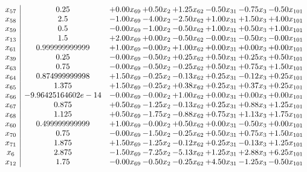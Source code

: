 \documentclass[8pt]{article}
\begin{document}
\[\begin{array}{c| c c@{\hskip 2pt} c@{\hskip 2pt} c@{\hskip 2pt} c@{\hskip 2pt} c@{\hskip 2pt} c@{\hskip 2pt} }
 x_{57}   &  0.25 & +  0.00 x_{69} & +  0.50 x_{2} & +  1.25 x_{62} & -0.50 x_{31} & -0.75 x_{3} & -0.50 x_{101}\\
 x_{58}   &  2.5 & -1.00 x_{69} & -4.00 x_{2} & -2.50 x_{62} & +  1.00 x_{31} & +  1.50 x_{3} & +  4.00 x_{101}\\
 x_{59}   &  0.5 & -0.00 x_{69} & -1.00 x_{2} & -0.50 x_{62} & +  1.00 x_{31} & +  0.50 x_{3} & +  1.00 x_{101}\\
 x_{13}   &  1.5 & +  2.00 x_{69} & +  0.00 x_{2} & -0.50 x_{62} & -0.00 x_{31} & -0.50 x_{3} & -0.00 x_{101}\\
 x_{61}   &  0.999999999999 & +  1.00 x_{69} & -0.00 x_{2} & +  1.00 x_{62} & +  0.00 x_{31} & +  0.00 x_{3} & +  0.00 x_{101}\\
 x_{39}   &  0.25 & -0.00 x_{69} & -0.50 x_{2} & +  0.25 x_{62} & +  0.50 x_{31} & +  0.25 x_{3} & +  0.50 x_{101}\\
 x_{63}   &  0.75 & -0.00 x_{69} & -0.50 x_{2} & -0.25 x_{62} & +  0.50 x_{31} & +  0.75 x_{3} & +  1.50 x_{101}\\
 x_{64}   &  0.874999999998 & +  1.50 x_{69} & -0.25 x_{2} & -0.13 x_{62} & +  0.25 x_{31} & -0.12 x_{3} & +  0.25 x_{101}\\
 x_{65}   &  1.375 & +  1.50 x_{69} & -0.25 x_{2} & +  0.38 x_{62} & +  0.25 x_{31} & +  0.37 x_{3} & +  0.25 x_{101}\\
 x_{66}   &  -9.96425164602e-14 & -0.00 x_{69} & -0.00 x_{2} & +  1.00 x_{62} & +  0.00 x_{31} & +  0.00 x_{3} & +  0.00 x_{101}\\
 x_{67}   &  0.875 & +  0.50 x_{69} & -1.25 x_{2} & -0.13 x_{62} & +  0.25 x_{31} & +  0.88 x_{3} & +  1.25 x_{101}\\
 x_{68}   &  1.125 & +  0.50 x_{69} & -1.75 x_{2} & -0.88 x_{62} & +  0.75 x_{31} & +  1.13 x_{3} & +  1.75 x_{101}\\
 x_{60}   &  0.499999999999 & +  1.00 x_{69} & -0.00 x_{2} & +  0.50 x_{62} & +  0.00 x_{31} & -0.50 x_{3} & +  0.00 x_{101}\\
 x_{70}   &  0.75 & -0.00 x_{69} & -1.50 x_{2} & -0.25 x_{62} & +  0.50 x_{31} & +  0.75 x_{3} & +  1.50 x_{101}\\
 x_{71}   &  1.875 & +  1.50 x_{69} & -1.25 x_{2} & -0.12 x_{62} & +  0.25 x_{31} & -0.13 x_{3} & +  1.25 x_{101}\\
 x_{6}   &  2.875 & -1.50 x_{69} & -7.25 x_{2} & -5.13 x_{62} & +  1.25 x_{31} & +  2.88 x_{3} & +  6.25 x_{101}\\
 x_{12}   &  1.75 & -0.00 x_{69} & -0.50 x_{2} & -0.25 x_{62} & +  4.50 x_{31} & -1.25 x_{3} & -0.50 x_{101}\\

\end{array}\]
\end{document}
